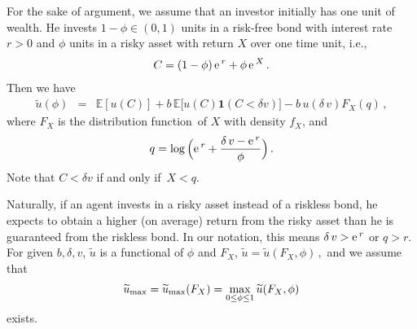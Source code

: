 \documentclass[11pt,a4]{amsart}
\newcommand{\ex}{{\rm e}\,}
\newcommand{\df}{distribution function}
\newcommand{\beao}{\begin{eqnarray*}}
\newcommand{\eeao}{\end{eqnarray*}\noindent}
\newcommand{\beam}{\begin{eqnarray}}
\newcommand{\eeam}{\end{eqnarray}\noindent}
\newcommand{\wt}{\widetilde}
\newcommand{\fif}{if and only if}
\newcommand{\E }{{\mathbb E}}
\newcommand{\1}{{\mathbf 1}}
\begin{document}
For the sake of argument, we assume that an investor initially has one
unit of wealth. He invests $1-\phi\in (0,1)$ units in a risk-free 
bond with interest rate $r>0$ and $\phi$ units in a risky asset with
return $X$ over one time unit, i.e.,
\beam\label{eq:xxie1}
  C = (1 - \phi)\, \ex^{r} + \phi \,\ex^{X}\,.
\eeam
Then we have 
\beao
\wt u(\phi) &=& \E [u(C)] + b\, \E \big[u(C)\1(C < \delta v)\big] - b \,u(\delta\, v) F_X(q)\,, %
\eeao
where $F_X$ is the \df\ of $X$ with density $f_X$, and
\beao
  q = %
\log\Big(
    \ex^r + {\delta \,v - \ex^r \over \phi}
  \Big)\,.
\eeao
Note that $C < \delta v$ \fif\ $X < q$. 
\par
Naturally, if an agent invests in
a risky asset instead of a riskless bond, he expects to obtain a
higher (on average) return from the risky asset than he is guaranteed from the
riskless bond. In our notation, this means $\delta \,v > \ex^r$ or
$q > r $. For given $b,\delta,v$, $\wt u$ is a functional of $\phi$ and $F_X$,
$
\wt u=\wt u (F_X, \phi)\,,
$
and we assume that
\beao
\wt u_{\rm max}=\wt u_{\rm max}(F_X) = \max_{0 \le  \phi \leq 1} \wt u (F_X,\phi)
\eeao
exists. 
\end{document}
